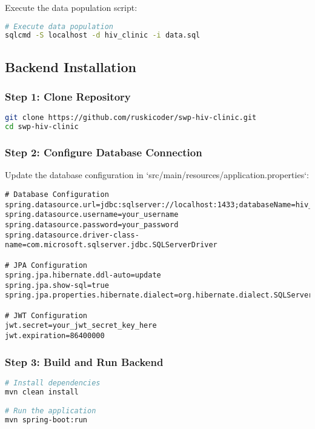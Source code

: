 \documentclass[12pt,a4paper]{article}
\begin{document}
Execute the data population script:

\begin{lstlisting}[language=bash, caption=Data Population]
# Execute data population
sqlcmd -S localhost -d hiv_clinic -i data.sql
\end{lstlisting}

\subsection{Backend Installation}

\subsubsection{Step 1: Clone Repository}

\begin{lstlisting}[language=bash, caption=Repository Clone]
git clone https://github.com/ruskicoder/swp-hiv-clinic.git
cd swp-hiv-clinic
\end{lstlisting}

\subsubsection{Step 2: Configure Database Connection}

Update the database configuration in `src/main/resources/application.properties`:

\begin{lstlisting}[language=properties, caption=Database Configuration]
# Database Configuration
spring.datasource.url=jdbc:sqlserver://localhost:1433;databaseName=hiv_clinic;encrypt=true;trustServerCertificate=true
spring.datasource.username=your_username
spring.datasource.password=your_password
spring.datasource.driver-class-name=com.microsoft.sqlserver.jdbc.SQLServerDriver

# JPA Configuration
spring.jpa.hibernate.ddl-auto=update
spring.jpa.show-sql=true
spring.jpa.properties.hibernate.dialect=org.hibernate.dialect.SQLServerDialect

# JWT Configuration
jwt.secret=your_jwt_secret_key_here
jwt.expiration=86400000
\end{lstlisting}

\subsubsection{Step 3: Build and Run Backend}

\begin{lstlisting}[language=bash, caption=Backend Build and Run]
# Install dependencies
mvn clean install

# Run the application
mvn spring-boot:run
\end{lstlisting}
\end{document}
